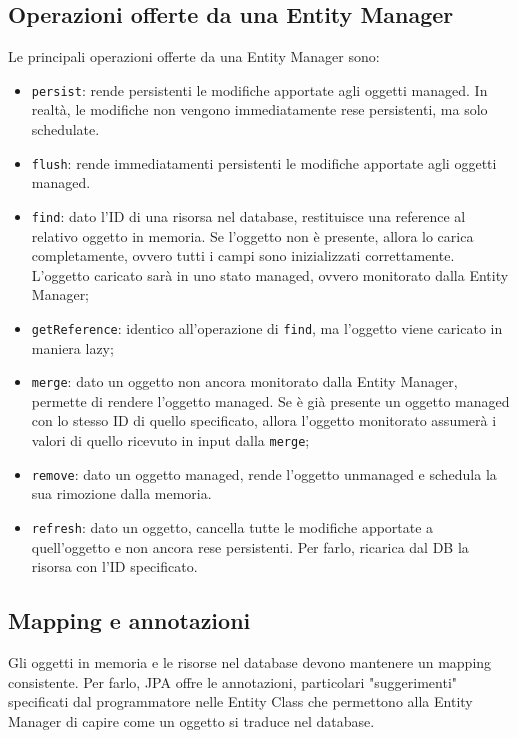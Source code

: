 \subsection{Operazioni offerte da una Entity Manager}
Le principali operazioni offerte da una Entity Manager sono:
\begin{itemize}
    \item \verb|persist|: rende persistenti le modifiche apportate agli oggetti managed. In realtà, le modifiche non vengono immediatamente rese persistenti, ma solo schedulate.
    \item \verb|flush|: rende immediatamenti persistenti le modifiche apportate agli oggetti managed.
    \item \verb|find|: dato l'ID di una risorsa nel database, restituisce una reference al relativo oggetto in memoria. Se l'oggetto non è presente, allora lo carica completamente, ovvero tutti i campi sono inizializzati correttamente. L'oggetto caricato sarà in uno stato managed, ovvero monitorato dalla Entity Manager;
    \item \verb|getReference|: identico all'operazione di \verb|find|, ma l'oggetto viene caricato in maniera lazy;
    \item \verb|merge|: dato un oggetto non ancora monitorato dalla Entity Manager, permette di rendere l'oggetto managed. Se è già presente un oggetto managed con lo stesso ID di quello specificato, allora l'oggetto monitorato assumerà i valori di quello ricevuto in input dalla \verb|merge|;
    \item \verb|remove|: dato un oggetto managed, rende l'oggetto unmanaged e schedula la sua rimozione dalla memoria.
    \item \verb|refresh|: dato un oggetto, cancella tutte le modifiche apportate a quell'oggetto e non ancora rese persistenti. Per farlo, ricarica dal DB la risorsa con l'ID specificato.
\end{itemize}

\subsection*{Mapping e annotazioni}
Gli oggetti in memoria e le risorse nel database devono mantenere un mapping consistente. Per farlo, JPA offre le annotazioni, particolari "suggerimenti" specificati dal programmatore nelle Entity Class che permettono alla Entity Manager di capire come un oggetto si traduce nel database.

